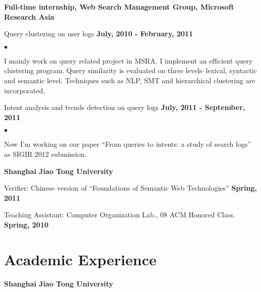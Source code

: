 \documentclass[margin,line]{res}
\newenvironment{list1}{
  \begin{list}{\ding{113}}{%
      \setlength{\itemsep}{0in}
      \setlength{\parsep}{0in} \setlength{\parskip}{0in}
      \setlength{\topsep}{0in} \setlength{\partopsep}{0in} 
      \setlength{\leftmargin}{0.17in}}}{\end{list}}
\newenvironment{list2}{
  \begin{list}{$\bullet$}{%
      \setlength{\itemsep}{0in}
      \setlength{\parsep}{0in} \setlength{\parskip}{0in}
      \setlength{\topsep}{0in} \setlength{\partopsep}{0in} 
      \setlength{\leftmargin}{0.2in}}}{\end{list}}
\begin{document}
\begin{resume}
{\bf Full-time internship, Web Search Management Group, Microsoft Research Asia}
\vspace*{0.1in}
\begin{list1}
\item[] Query clustering on user logs \hfill {\bf July, 2010 - February, 2011}\\
\vspace*{-.1in}
\begin{list2}
\item I mainly work on query related project in MSRA.  I implement an efficient query clustering program. Query similarity is evaluated on three levels--lexical, syntactic and semantic level. Techniques such as NLP, SMT and hierarchical clustering are incorporated. 
\end{list2}
\vspace*{0.1in}
\item[] Intent analysis and trends detection on query logs \hfill {\bf July, 2011 - September, 2011}\\
\vspace*{-.1in}
\begin{list2}
\item Now I'm working on our paper ``From queries to intents: a study of search logs'' as SIGIR 2012 submission. 
\end{list2}
\end{list1}
{\bf Shanghai Jiao Tong University}
\begin{list1}
\item[] Verifier: Chinese version of ``Foundations of Semantic Web Technologies'' \hfill {\bf Spring, 2011}\\
\end{list1}
\vspace*{-.1in}
\begin{list1}
\item[] Teaching Assistant: Computer Organization Lab., 08 ACM Honored Class. \hfill {\bf Spring, 2010}\\
\end{list1}
\section{\sc Academic Experience}
{\bf Shanghai Jiao Tong University}
\vspace*{-.1in}


\end{resume}
\end{document}
